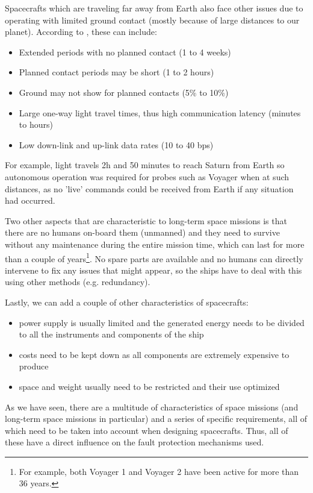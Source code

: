 Spacecrafts which are traveling far away from Earth also face other issues due
to operating with limited ground contact (mostly because of large distances to
our planet). According to \cite{fm-jpl}, these can include:
\begin{itemize}
  \item Extended periods with no planned contact (1 to 4 weeks)
  \item Planned contact periods may be short (1 to 2 hours)
  \item Ground may not show for planned contacts (5\% to 10\%)
  \item Large one-way light travel times, thus high communication latency
  (minutes to hours)
  \item Low down-link and up-link data rates (10 to 40 bps)
\end{itemize}
For example, light travels 2h and 50 minutes to reach Saturn from Earth so
autonomous operation was required for probes such as Voyager when at such
distances, as no 'live' commands could be received from Earth if any situation
had occurred.

Two other aspects that are characteristic to long-term space missions is that
there are no humans on-board them (unmanned) and they need to survive without any
maintenance during the entire mission time, which can last for more than a
couple of years\footnote{For example, both Voyager 1 and Voyager 2 have been
active for more than 36 years.}. No spare parts are available and no humans can
directly intervene to fix any issues that might appear, so the ships have to
deal with this using other methods (e.g. redundancy).

Lastly, we can add a couple of other characteristics of spacecrafts:
\begin{itemize}
  \item power supply is usually limited and the generated energy needs to be
  divided to all the instruments and components of the ship
  \item costs need to be kept down as all components are extremely expensive to
  produce
  \item space and weight usually need to be restricted and their use optimized
\end{itemize}

As we have seen, there are a multitude of characteristics of space missions (and
long-term space missions in particular) and a series of specific requirements,
all of which need to be taken into account when designing spacecrafts. Thus, all
of these have a direct influence on the fault protection mechanisms used.

